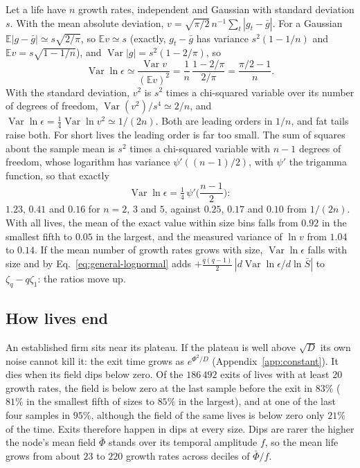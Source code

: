 \documentclass[pre,twocolumn,superscriptaddress,nofootinbib]{revtex4-2}
\newcommand{\E}{\mathbb E}
\newcommand{\Var}{\operatorname{Var}}
\newcommand{\Sb}{\bar S}
\begin{document}
Let a life have $n$ growth rates, independent and Gaussian with standard deviation $s$.  With the mean absolute
deviation, $v=\sqrt{\pi/2}\,n^{-1}\sum_t|g_t-\bar g|$.  For a Gaussian $\E|g-\bar g|\simeq s\sqrt{2/\pi}$, so $\E v\simeq s$
(exactly, $g_t-\bar g$ has variance $s^2(1-1/n)$ and $\E v=s\sqrt{1-1/n}$),
and $\Var|g|=s^2(1-2/\pi)$, so
\begin{equation}
\Var\ln\epsilon\simeq\frac{\Var v}{(\E v)^2}=\frac1n\,\frac{1-2/\pi}{2/\pi}=\frac{\pi/2-1}{n}.
\end{equation}
With the standard deviation, $v^2$ is $s^2$ times a chi-squared variable over its number of degrees of freedom,
$\Var(v^2)/s^4\simeq2/n$, and $\Var\ln\epsilon=\tfrac14\Var\ln v^2\simeq1/(2n)$.  Both are leading orders in $1/n$, and fat
tails raise both.  For short lives the leading order is far too small.  The sum of squares about the
sample mean is $s^2$ times a chi-squared variable with $n-1$ degrees of freedom, whose logarithm has
variance $\psi'((n-1)/2)$, with $\psi'$ the trigamma function, so that exactly
\begin{equation}
\Var\ln\epsilon=\tfrac14\,\psi'\Big(\frac{n-1}{2}\Big):
\end{equation}
$1.23$, $0.41$ and $0.16$ for $n=2$, $3$ and $5$, against $0.25$, $0.17$ and $0.10$ from $1/(2n)$.  With all
lives, the mean of the exact value within size bins falls from $0.92$ in the smallest fifth to $0.05$ in
the largest, and the measured variance of $\ln v$ from $1.04$ to $0.14$.  If the mean number of growth rates grows with size, $\Var\ln\epsilon$ falls with size and by
Eq.~\eqref{eq:general-lognormal} adds $+\tfrac{q(q-1)}2\,|d\Var\ln\epsilon/d\ln\Sb|$ to $\zeta_q-q\zeta_1$: the ratios move up.

\subsection{How lives end}

An established firm sits near its plateau.  If the plateau is well above $\sqrt D$ its own noise cannot kill it:
the exit time grows as $e^{\Phi^2/D}$ (Appendix~\ref{app:constant}).  It dies when its field dips below zero.  Of
the $186\,492$ exits of lives with at least $20$ growth rates, the field is below zero at the last sample before the exit in $83\%$ ($81\%$ in the smallest fifth of sizes to $85\%$ in the largest),
and at one of the last four samples in $95\%$, although the field of the same lives is below zero only $21\%$ of the
time.  Exits therefore happen in dips at every size.  Dips are rarer the higher the node's mean field $\bar\Phi$
stands over its temporal amplitude $f$, so the mean life grows from about $23$ to $220$ growth rates across deciles of
$\bar\Phi/f$.
\end{document}
